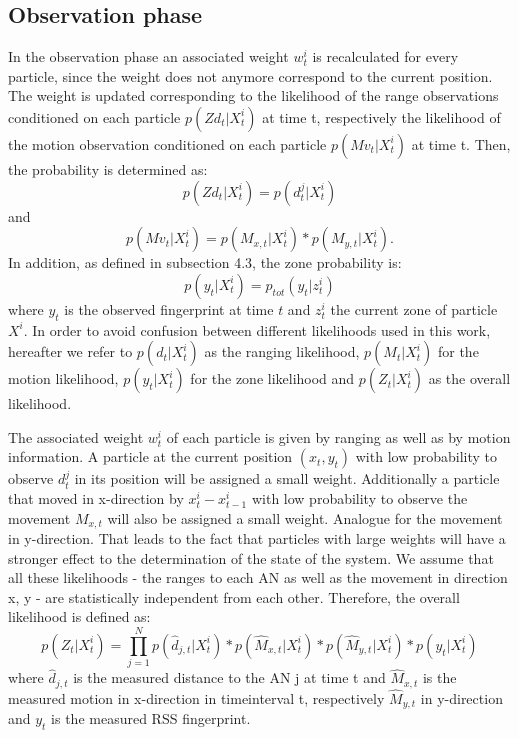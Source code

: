 \subsection{Observation phase}
In the observation phase an associated weight $w^{i}_{t}$ is recalculated for every particle, since the weight does not anymore correspond to the current position. The weight is updated corresponding to the likelihood of the range observations conditioned on each particle $p(Zd_{t} | X^{i}_{t})$ at time t, respectively the likelihood of the motion observation conditioned on each particle $p(Mv_{t} | X^{i}_{t})$ at time t. Then, the probability is determined as:
$$ p(Zd_{t} | X^{i}_{t}) = p(d_{t}^{j} | X^{i}_{t}) $$
and $$ p(Mv_{t} | X^{i}_{t}) = p(M_{x,t} | X^{i}_{t}) * p(M_{y,t} | X^{i}_{t}).$$ %
In addition, as defined in subsection 4.3, the zone probability is:
$$ p(y_t | X^{i}_{t}) = p_{tot}(y_{t} | z^{i}_{t})$$
where $y_t$ is the observed fingerprint at time $t$ and $z^{i}_{t}$ the current zone of particle $X^{i}$.
In order to avoid confusion between different likelihoods used in this work, hereafter we refer to $p(d_{t} | X^{i}_{t})$ as the ranging likelihood, $p(M_{t} | X^{i}_{t})$ for the motion likelihood, $p(y_t | X^{i}_{t})$ for the zone likelihood and $p(Z_{t} | X^{i}_{t})$ as the overall likelihood.

The associated weight $w^{i}_{t}$ of each particle is given by ranging as well as by motion information. A particle at the current position $(x_{t},y_{t})$ with low probability to observe $d_{t}^{j}$ in its position will be assigned a small weight. Additionally a particle that moved in x-direction by $x_{t}^{i}-x_{t-1}^{i}$ with low probability to observe the movement $M_{x,t}$ will also be assigned a small weight. Analogue for the movement in y-direction.
That leads to the fact that particles with large weights will have a stronger effect to the determination of the state of the system.
We assume that all these likelihoods - the ranges to each AN as well as the movement in direction x, y - are statistically independent from each other. Therefore, the overall likelihood is defined as:
$$p(Z_{t} | X^{i}_{t}) = \prod_{j=1}^{N} p(\hat{d}_{j,t}|X_{t}^{i}) * p(\hat{M}_{x,t} | X^{i}_{t}) * p(\hat{M}_{y,t} | X^{i}_{t}) * p(y_t | X^{i}_{t})$$
where $\hat{d}_{j,t}$ is the measured distance to the AN j at time t and $\hat{M}_{x,t}$ is the measured motion in x-direction in timeinterval t, respectively $\hat{M}_{y,t}$ in y-direction and $y_t$ is the measured RSS fingerprint.

